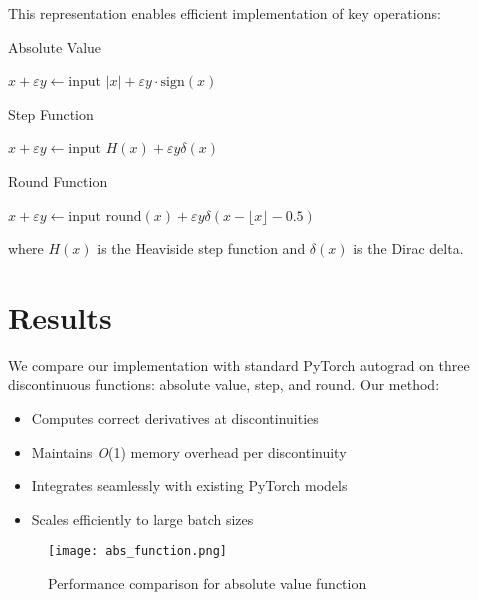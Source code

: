 \documentclass{article}
\begin{document}
This representation enables efficient implementation of key operations:

\begin{algorithm}
\caption{Absolute Value}
\begin{algorithmic}[1]
\State $x + \varepsilon y \gets \text{input}$
\State \Return $|x| + \varepsilon y \cdot \text{sign}(x)$
\end{algorithmic}
\end{algorithm}

\begin{algorithm}
\caption{Step Function}
\begin{algorithmic}[1]
\State $x + \varepsilon y \gets \text{input}$
\State \Return $H(x) + \varepsilon y \delta(x)$
\end{algorithmic}
\end{algorithm}

\begin{algorithm}
\caption{Round Function}
\begin{algorithmic}[1]
\State $x + \varepsilon y \gets \text{input}$
\State \Return $\text{round}(x) + \varepsilon y \delta(x - \lfloor x \rfloor - 0.5)$
\end{algorithmic}
\end{algorithm}

where $H(x)$ is the Heaviside step function and $\delta(x)$ is the Dirac delta.

\section{Results}

We compare our implementation with standard PyTorch autograd on three discontinuous functions: absolute value, step, and round. Our method:

\begin{itemize}
    \item Computes correct derivatives at discontinuities
    \item Maintains \textit{O}(1) memory overhead per discontinuity
    \item Integrates seamlessly with existing PyTorch models
    \item Scales efficiently to large batch sizes
\end{itemize}

\begin{figure}[h]
\centering
\texttt{[image: abs\_function.png]}
\caption{Performance comparison for absolute value function}
\end{figure}
\end{document}
